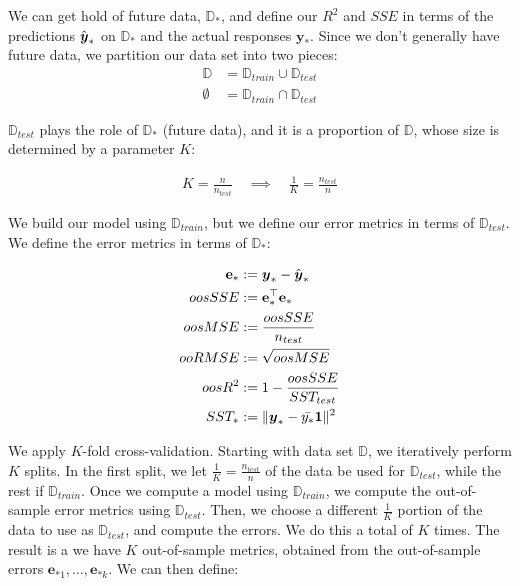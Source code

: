 \documentclass[12pt]{article}
\begin{document}
\begin{enumerate}

We can get hold of future data, $\mathbb{D}_*$, and define our $R^2$ and $SSE$
in terms of the predictions $\hat{\boldsymbol{y}}_*$ on $\mathbb{D}_*$ and the actual responses
$\mathbf{y}_*$. Since we don't generally have future data, we partition our data
set into two pieces:
\begin{align*}
	\mathbb{D} &= \mathbb{D}_{train} \cup \mathbb{D}_{test}\\
	\emptyset &= \mathbb{D}_{train}\cap \mathbb{D}_{test}
\end{align*}

$\mathbb{D}_{test}$ plays the role of $\mathbb{D}_{*}$ (future data),
and it is a proportion of $\mathbb{D}$, whose size is determined
by a parameter $K$:

\begin{align*}
	K = \frac{n}{n_{test}}\quad \implies \quad \frac{1}{K} = \frac{n_{test}}{n}
\end{align*}

We build our model using $\mathbb{D}_{train}$, but we define our error metrics
in terms of $\mathbb{D}_{test}$. We define the error metrics in terms of
$\mathbb{D}_*$:

\begin{align*}
	\mathbf{e}_* &:= \boldsymbol{y}_* - \hat{\boldsymbol{y}}_*\\
	oosSSE &:= \mathbf{e}_*^\top\mathbf{e}_*\\
	oosMSE&:=\frac{oosSSE}{n_{test}}\\
	ooRMSE&:=\sqrt{oosMSE}\\
	oosR^2&:=1-\frac{oosSSE}{SST_{test}}\\
	SST_* &:=\|\boldsymbol{y}_*-\bar{y_*}\mathbf{1}\|^2
\end{align*}




We apply $K$-fold cross-validation. Starting with data set $\mathbb{D}$, we iteratively
perform $K$ splits. In the first split, we let $\frac{1}{K}=\frac{n_{test}}{n}$ of the
data be used for $\mathbb{D}_{test}$, while the rest if $\mathbb{D}_{train}$. Once we
compute a model using $\mathbb{D}_{train}$, we compute the out-of-sample error metrics
using $\mathbb{D}_{test}$. Then, we choose a different $\frac{1}{K}$ portion of the data
to use as $\mathbb{D}_{test}$, and compute the errors. We do this a total of $K$ times.
The result is a we have $K$ out-of-sample metrics, obtained from the out-of-sample
errors $\mathbf{e}_{*1},\ldots,\mathbf{e}_{*k}$. We can then define:


\end{enumerate}
\end{document}
